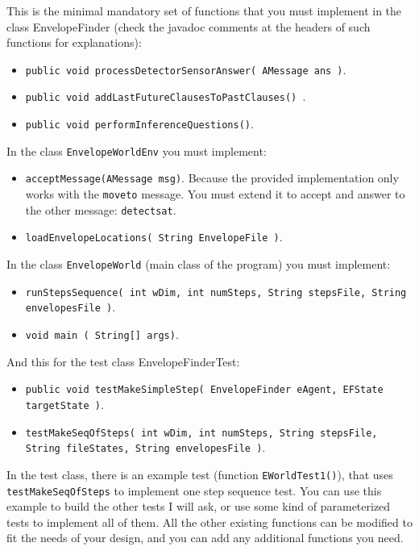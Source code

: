 \documentclass{tufte-handout}
\begin{document}
\begin{fullwidth}
This is the minimal mandatory set of functions that you must implement in the class EnvelopeFinder
(check the javadoc comments at the headers of such functions for explanations):
\begin{itemize}
\item {\tt public void processDetectorSensorAnswer( AMessage ans )}.
\item {\tt  public void addLastFutureClausesToPastClauses() }.
\item {\tt public void  performInferenceQuestions()}.
\end{itemize}
In the class {\tt EnvelopeWorldEnv} you must implement:
\begin{itemize}
\item {\tt acceptMessage(AMessage msg)}. Because the provided implementation only works with
the {\tt moveto} message. You must extend it to accept and answer to the other message:
{\tt detectsat}.
\item {\tt loadEnvelopeLocations( String EnvelopeFile )}.
\end{itemize}
In the class {\tt EnvelopeWorld} (main class of the program) you must implement:
\begin{itemize}
\item {\tt runStepsSequence( int wDim, int numSteps,
                           String stepsFile, String envelopesFile )}.
\item {\tt void main ( String[] args)}.
\end{itemize}
And this for the test class EnvelopeFinderTest:
\begin{itemize}
\item {\tt public void testMakeSimpleStep(  EnvelopeFinder eAgent,
                                            EFState targetState )}.
\item {\tt  testMakeSeqOfSteps( int wDim,
                                 int numSteps, String stepsFile, String fileStates, String envelopesFile )}.
\end{itemize}

In the test class, there is an example test (function {\tt  EWorldTest1()}), that uses
{\tt testMakeSeqOfSteps} to implement one step sequence test. You can use this example to build
the other tests I will ask, or use some kind of parameterized tests to implement all of them.
All the other existing functions can be modified to fit the needs of your design,
and you can add any  additional functions you need.
\end{fullwidth}
\end{document}
